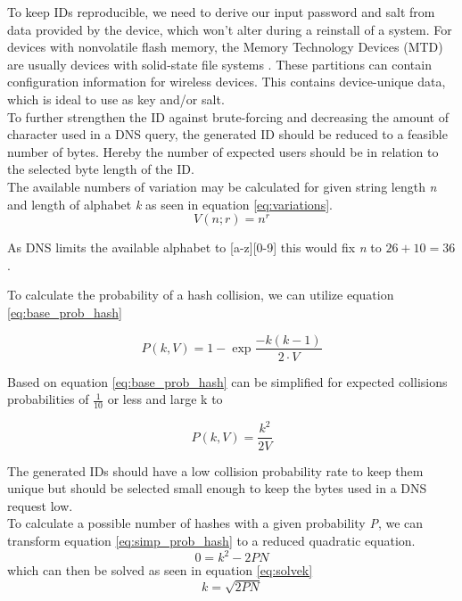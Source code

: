         To keep IDs reproducible, we need to derive our input password and salt from data provided by the device, which won't alter during a reinstall of a system. For devices with nonvolatile flash memory, the Memory Technology Devices (MTD) are usually devices with solid-state file systems \cite{giometti_mtd_2017} \cite{woodhouse_memory_nodate}. These partitions can contain configuration information for wireless devices. This contains device-unique data, which is ideal to use as key and/or salt.\\
        
        To further strengthen the ID against brute-forcing and decreasing the amount of character used in a DNS query, the generated ID should be reduced to a feasible number of bytes. Hereby the number of expected users should be in relation to the selected byte length of the ID.\\
        The available numbers of variation may be calculated for given string length \textit{n} and length of alphabet \textit{k} as seen in equation \ref{eq:variations}.
        \begin{equation}
            \label{eq:variations}
            V(n;r) = n^{r}
        \end{equation}

        As DNS limits the available alphabet to [a-z][0-9] this would fix \textit{n} to $26 + 10 = 36$.
        
        To calculate the probability of a hash collision, we can utilize equation \ref{eq:base_prob_hash}
        
        \begin{equation}
             \label{eq:base_prob_hash}
             P(k,V) = 1 - \exp{\frac{-k(k-1)}{2 \cdot V}}
        \end{equation}
     
        Based on  \cite{preshing_hash_2011} equation \ref{eq:base_prob_hash} can be simplified for expected collisions probabilities of $\frac{1}{10}$ or less and large k to
     
        \begin{equation}
            \label{eq:simp_prob_hash}
            P(k,V) = \frac{k^2}{2V} 
        \end{equation}

\newpage

        The generated IDs should have a low collision probability rate to keep them unique but should be selected small enough to keep the bytes used in a DNS request low. \\
        To calculate a possible number of hashes with a given probability \textit{P}, we can transform equation \ref{eq:simp_prob_hash} to a reduced quadratic equation.
        \begin{equation*}
            0 = k^2 - 2PN
        \end{equation*}
        which can then be solved as seen in equation \ref{eq:solvek}
        \begin{equation}
            \label{eq:solvek}
            k = \sqrt{2PN}
        \end{equation}
        
